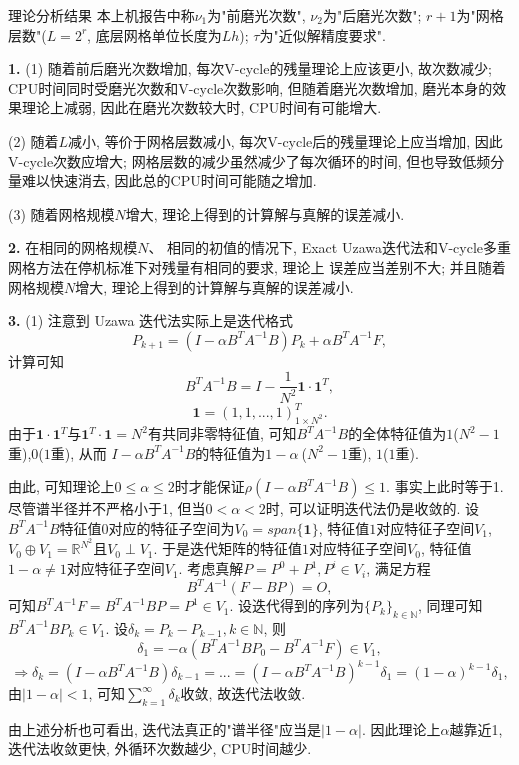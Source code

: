 \documentclass{article}
\begin{document}
\begin{section}{理论分析结果}
    本上机报告中称$\nu_1$为"前磨光次数", $\nu_2$为"后磨光次数"; $r+1$为"网格层数"($L=2^r$, 底层网格单位长度为$Lh$); $\tau$为"近似解精度要求".

   \noindent\textbf{1.} (1) 随着前后磨光次数增加, 每次V-cycle的残量理论上应该更小, 故次数减少; 
    CPU时间同时受磨光次数和V-cycle次数影响, 
   但随着磨光次数增加, 磨光本身的效果理论上减弱, 因此在磨光次数较大时, CPU时间有可能增大.
   
   (2) 随着$L$减小, 等价于网格层数减小, 每次V-cycle后的残量理论上应当增加, 因此V-cycle次数应增大; 网格层数的减少虽然减少了每次循环的时间, 但也导致低频分量难以快速消去, 因此总的CPU时间可能随之增加.

   (3) 随着网格规模$N$增大, 理论上得到的计算解与真解的误差减小.

   \noindent\textbf{2.} 在相同的网格规模$N$、 相同的初值的情况下, Exact Uzawa迭代法和V-cycle多重网格方法在停机标准下对残量有相同的要求, 理论上
   误差应当差别不大; 并且随着网格规模$N$增大, 理论上得到的计算解与真解的误差减小.
   
   \noindent\textbf{3.} (1) 注意到 Uzawa 迭代法实际上是迭代格式$$P_{k+1}=(I-\alpha B^TA^{-1}B)P_k+\alpha B^TA^{-1}F,$$
   计算可知$$B^TA^{-1}B=I-\frac{1}{N^2}\textbf{1}\cdot\textbf{1}^T,$$ $$\textbf{1}=(1,1,...,1)_{1\times N^2}^T.$$
   由于$\textbf{1}\cdot\textbf{1}^T$与$\textbf{1}^T\cdot\textbf{1}=N^2$有共同非零特征值, 可知$B^TA^{-1}B$的全体特征值为$1$($N^2-1$重),$0$($1$重), 从而
   $I-\alpha B^TA^{-1}B$的特征值为$1-\alpha\ $($N^2-1$重), $1$($1$重).

   由此, 可知理论上$0\leq\alpha\leq 2$时才能保证$\rho(I-\alpha B^TA^{-1}B)\leq 1$. 事实上此时等于1. 尽管谱半径并不严格小于1, 但当$0<\alpha<2$时, 可以证明迭代法仍是收敛的.
   设$B^TA^{-1}B$特征值$0$对应的特征子空间为$V_0=span\{\textbf{1}\}$, 特征值$1$对应特征子空间$V_1$, $V_0\oplus V_1=\mathbb{R}^{N^2}$且$V_0\perp V_1$. 于是迭代矩阵的特征值$1$对应特征子空间$V_0$, 
   特征值$1-\alpha\neq 1$对应特征子空间$V_1$. 考虑真解$P=P^0+P^1,P^i\in V_i$, 满足方程$$B^TA^{-1}(F-BP)=O,$$
   可知$B^TA^{-1}F=B^TA^{-1}BP=P^1\in V_1$. 设迭代得到的序列为$\{P_k\}_{k\in\mathbb{N}}$, 同理可知$B^TA^{-1}BP_k\in V_1$. 设$\delta_k=P_k-P_{k-1}, k\in\mathbb{N}$, 
   则$$\delta_1=-\alpha(B^TA^{-1}BP_0-B^TA^{-1}F)\in V_1,$$
   $$\Rightarrow \delta_k=(I-\alpha B^TA^{-1}B)\delta_{k-1}=...=(I-\alpha B^TA^{-1}B)^{k-1}\delta_1=(1-\alpha)^{k-1}\delta_1,$$
   由$|1-\alpha|<1$, 可知$\sum_{k=1}^{\infty}\delta_k$收敛, 故迭代法收敛.
   
   由上述分析也可看出, 迭代法真正的"谱半径"应当是$|1-\alpha|$. 因此理论上$\alpha$越靠近1, 迭代法收敛更快, 外循环次数越少, CPU时间越少. 


\end{section}
\end{document}
